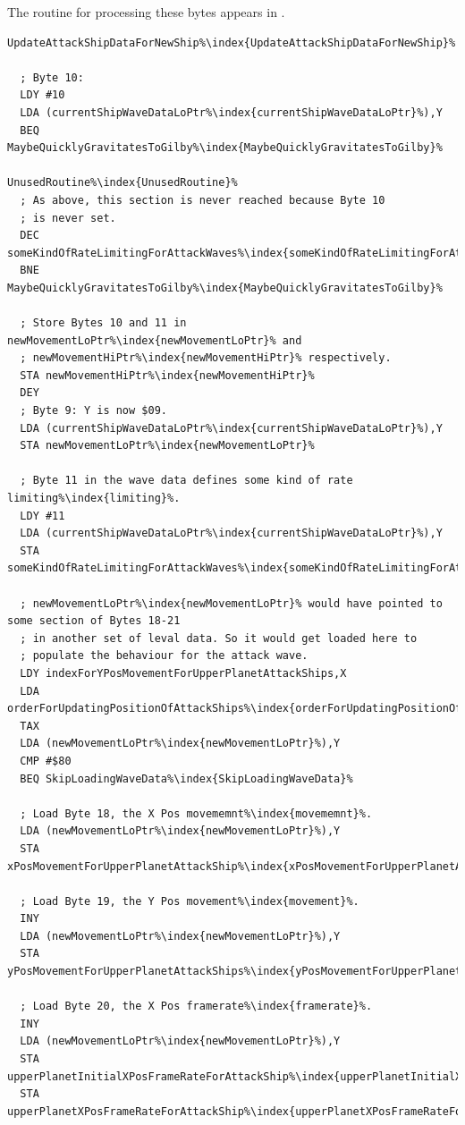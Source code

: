 The routine for processing these bytes appears in . 

\begin{lstlisting}[escapechar=\%]
UpdateAttackShipDataForNewShip%\index{UpdateAttackShipDataForNewShip}%

  ; Byte 10:
  LDY #10
  LDA (currentShipWaveDataLoPtr%\index{currentShipWaveDataLoPtr}%),Y
  BEQ MaybeQuicklyGravitatesToGilby%\index{MaybeQuicklyGravitatesToGilby}%

UnusedRoutine%\index{UnusedRoutine}%
  ; As above, this section is never reached because Byte 10
  ; is never set.
  DEC someKindOfRateLimitingForAttackWaves%\index{someKindOfRateLimitingForAttackWaves}%,X
  BNE MaybeQuicklyGravitatesToGilby%\index{MaybeQuicklyGravitatesToGilby}%

  ; Store Bytes 10 and 11 in newMovementLoPtr%\index{newMovementLoPtr}% and 
  ; newMovementHiPtr%\index{newMovementHiPtr}% respectively.
  STA newMovementHiPtr%\index{newMovementHiPtr}%
  DEY
  ; Byte 9: Y is now $09.
  LDA (currentShipWaveDataLoPtr%\index{currentShipWaveDataLoPtr}%),Y
  STA newMovementLoPtr%\index{newMovementLoPtr}%

  ; Byte 11 in the wave data defines some kind of rate limiting%\index{limiting}%.
  LDY #11
  LDA (currentShipWaveDataLoPtr%\index{currentShipWaveDataLoPtr}%),Y
  STA someKindOfRateLimitingForAttackWaves%\index{someKindOfRateLimitingForAttackWaves}%,X

  ; newMovementLoPtr%\index{newMovementLoPtr}% would have pointed to some section of Bytes 18-21
  ; in another set of leval data. So it would get loaded here to
  ; populate the behaviour for the attack wave.
  LDY indexForYPosMovementForUpperPlanetAttackShips,X
  LDA orderForUpdatingPositionOfAttackShips%\index{orderForUpdatingPositionOfAttackShips}%,X
  TAX
  LDA (newMovementLoPtr%\index{newMovementLoPtr}%),Y
  CMP #$80
  BEQ SkipLoadingWaveData%\index{SkipLoadingWaveData}%

  ; Load Byte 18, the X Pos movememnt%\index{movememnt}%.
  LDA (newMovementLoPtr%\index{newMovementLoPtr}%),Y
  STA xPosMovementForUpperPlanetAttackShip%\index{xPosMovementForUpperPlanetAttackShip}%,X
  
  ; Load Byte 19, the Y Pos movement%\index{movement}%.
  INY
  LDA (newMovementLoPtr%\index{newMovementLoPtr}%),Y
  STA yPosMovementForUpperPlanetAttackShips%\index{yPosMovementForUpperPlanetAttackShips}%,X

  ; Load Byte 20, the X Pos framerate%\index{framerate}%.
  INY
  LDA (newMovementLoPtr%\index{newMovementLoPtr}%),Y
  STA upperPlanetInitialXPosFrameRateForAttackShip%\index{upperPlanetInitialXPosFrameRateForAttackShip}%,X
  STA upperPlanetXPosFrameRateForAttackShip%\index{upperPlanetXPosFrameRateForAttackShip}%,X


\end{lstlisting}
